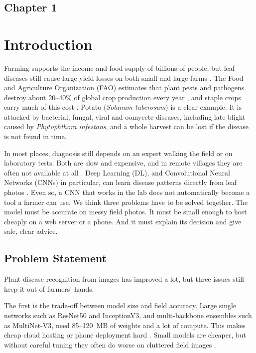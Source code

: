 \begin{center}
    \section*{\fontsize{20}{20}\selectfont Chapter 1}
\end{center}
\vspace{10mm}
\section{Introduction}

Farming supports the income and food supply of billions of people, but leaf diseases still cause large yield losses on both small and large farms \cite{fao2017future}. The Food and Agriculture Organization (FAO) estimates that plant pests and pathogens destroy about 20--40\% of global crop production every year \cite{strange2005plant}, and staple crops carry much of this cost \cite{savary2019global}. Potato (\textit{Solanum tuberosum}) is a clear example. It is attacked by bacterial, fungal, viral and oomycete diseases, including late blight caused by \textit{Phytophthora infestans}, and a whole harvest can be lost if the disease is not found in time.

In most places, diagnosis still depends on an expert walking the field or on laboratory tests. Both are slow and expensive, and in remote villages they are often not available at all \cite{barbedo2018factors}. Deep Learning (DL), and Convolutional Neural Networks (CNNs) in particular, can learn disease patterns directly from leaf photos \cite{lecun2015deep}. Even so, a CNN that works in the lab does not automatically become a tool a farmer can use. We think three problems have to be solved together. The model must be accurate on messy field photos. It must be small enough to host cheaply on a web server or a phone. And it must explain its decision and give safe, clear advice.

\subsection{Problem Statement}
Plant disease recognition from images has improved a lot, but three issues still keep it out of farmers' hands.

The first is the trade-off between model size and field accuracy. Large single networks such as ResNet50 and InceptionV3, and multi-backbone ensembles such as MultiNet-V3, need 85--120~MB of weights and a lot of compute. This makes cheap cloud hosting or phone deployment hard \cite{sandler2018mobilenetv2, ferentinos2018deep}. Small models are cheaper, but without careful tuning they often do worse on cluttered field images \cite{kc2019depthwise, too2019comparative}.

